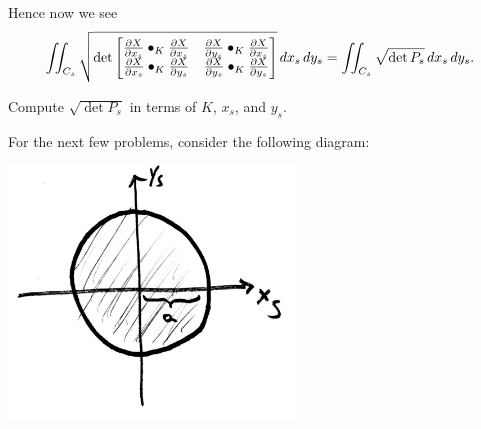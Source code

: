 \documentclass[newpage,hints,handout]{ximera}
\begin{document}
Hence now we see 
\[
\iint_{C_s} \sqrt{
  \det
  \begin{bmatrix}
    \pp[X]{x_s}\bullet_K \pp[X]{x_s} & \pp[X]{y_s}\bullet_K \pp[X]{x_s} \\
    \pp[X]{x_s}\bullet_K \pp[X]{y_s} & \pp[X]{y_s}\bullet_K \pp[X]{y_s}
  \end{bmatrix}
}\d x_s\d y_s = \iint_{C_s} \sqrt{\det P_s}\d x_s\d y_s.
\]

\begin{problem}
  Compute $\sqrt{\det P_s}$ in terms of $K$, $x_s$, and $y_s$.
\end{problem}

For the next few problems, consider the following diagram:
\begin{image}
  \includegraphics[width=3in]{stereoCirc.png}
\end{image}
\end{document}
